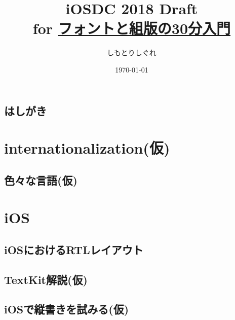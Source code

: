 \documentclass[10pt,twoside,openright,dvipdfmx]{jsbook}
\title{%
    iOSDC 2018 Draft \\
    \large for \href{https://fortee.jp/iosdc-japan-2018/proposal/8e9e8e22-8ff1-4381-813a-347475c2606f}{フォントと組版の30分入門}}
\author[$\dagger$]{しもとりしぐれ}
\affil[$\dagger$]{@S\_Shimotori}
\date{\today}
\newcommand\blankpage{%
    \null
    \thispagestyle{empty}
    \addtocounter{page}{-1}
    \newpage
}
\begin{document}
\maketitle
\restoregeometry

\afterpage{\blankpage}


\tableofcontents
\thispagestyle{plain}

\chapter*{はしがき}
\thispagestyle{plain}


\cleardoublepage



\part{internationalization(仮)}\label{part:internationalization}
\restoregeometry

\chapter{色々な言語(仮)}\label{chapter:internationalization/languages}
\thispagestyle{plain}


\part{iOS}\label{part:ios}
\restoregeometry

\chapter{iOSにおけるRTLレイアウト}\label{chapter:ios/rtl}
\thispagestyle{plain}


\chapter{TextKit解説(仮)}\label{chapter:ios/textKit}
\thispagestyle{plain}


\chapter{iOSで縦書きを試みる(仮)}\label{chapter:ios/vertical}
\thispagestyle{plain}

\end{document}
